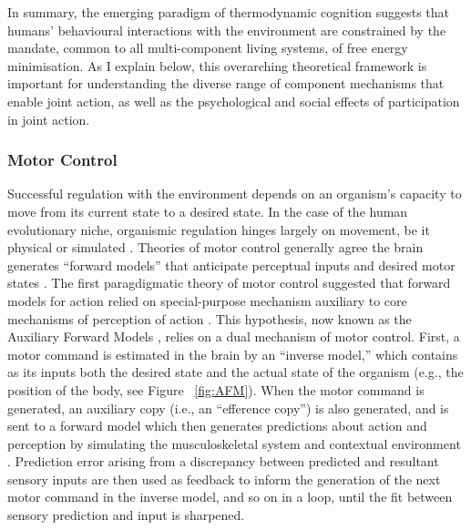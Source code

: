\begin{CJK}{UTF8}{gbsn}
In summary, the emerging paradigm of thermodynamic cognition suggests that humans' behavioural interactions with the environment are constrained by the mandate, common to all multi-component living systems, of free energy minimisation.  As I explain below, this overarching theoretical framework is important for understanding the diverse range of component mechanisms that enable joint action, as well as the psychological and social effects of participation in joint action.




\subsubsection{Motor Control}
Successful regulation with the environment depends on an organism's capacity to move from its current state to a desired state.  In the case of the human evolutionary niche, organismic regulation hinges largely on movement, be it physical or simulated \citep{Wolpert1995}.  Theories of motor control generally agree the brain generates ``forward models'' that anticipate perceptual inputs and desired motor states \citep{Pickering2014}. The first paragdigmatic theory of motor control suggested that forward models for action relied on special-purpose mechanism auxiliary to core mechanisms of perception of action \citep{Wolpert1997}.  This hypothesis, now known as the Auxiliary Forward Models \citep[AFM, see][]{Pickering2014}, relies on a dual mechanism of motor control.  First, a motor command is estimated in the brain by an ``inverse model,'' which contains as its inputs both the desired state and the actual state of the organism (e.g., the position of the body, see Figure ~\ref{fig:AFM}).  When the motor command is generated, an auxiliary copy (i.e., an ``efference copy'') is also generated, and is sent to a forward model which then generates predictions about action and perception by simulating the musculoskeletal system and contextual environment \citep{Wolpert1995,Blakemore1998,Flanagan2003}.  Prediction error arising from a discrepancy between predicted and resultant sensory inputs are then used as feedback to inform the generation of the next motor command in the inverse model, and so on in a loop, until the fit between sensory prediction and input is sharpened.


\end{CJK}
